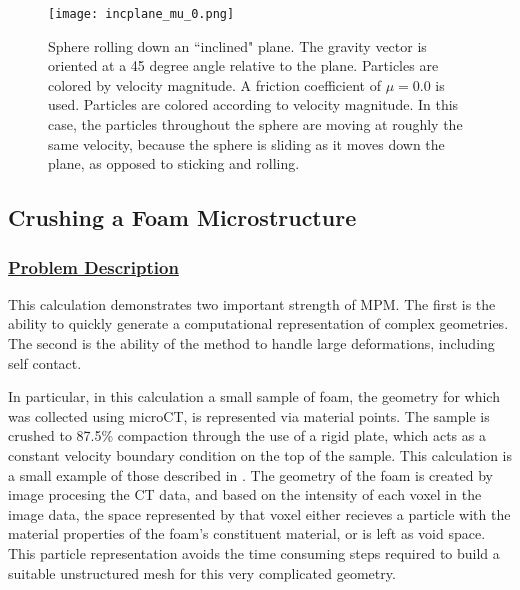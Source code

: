 \begin{figure}
  \center
  \vspace{-15pt}
  \texttt{[image: incplane\_mu\_0.png]}
  \caption{Sphere rolling down an ``inclined" plane.  The gravity vector
is oriented at a 45 degree angle relative to the plane.  Particles are colored
by velocity magnitude.  A friction coefficient of $\mu = 0.0$ is used.
Particles are colored according to velocity magnitude.  In this case,
the particles throughout the sphere are moving at roughly the same velocity,
because the sphere is sliding as it moves down the plane, as opposed to
sticking and rolling.}
  \label{figincplaneSphere_0mu}
\end{figure}

\subsection*{\center Crushing a Foam Microstructure}
\subsubsection*{\underline{Problem Description}}
This calculation demonstrates two important strength of MPM.  The first
is the ability to quickly generate a computational representation of
complex geometries.  The second is the ability of the method to handle
large deformations, including self contact.

In particular, in this calculation a small sample of foam, the geometry
for which was collected using microCT, is represented via material points.
The sample is crushed to 87.5\% compaction through the use of a rigid plate, which
acts as a constant velocity boundary condition on the top of the sample.  This
calculation is a small example of those described in \cite{brydonfoam}.  The
geometry of the foam is created by image procesing the CT data, and based
on the intensity of each voxel in the image data, the space represented
by that voxel either recieves a particle with the material properties of the
foam's constituent material, or is left as void space.  This particle
representation avoids the time consuming steps required to build a suitable
unstructured mesh for this very complicated geometry.
 
